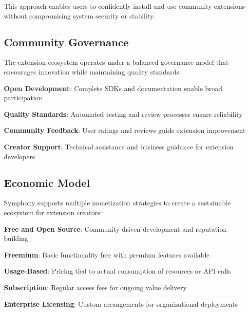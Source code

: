 This approach enables users to confidently install and use community extensions without compromising system security or stability.

\subsection*{Community Governance}

The extension ecosystem operates under a \textcolor{brandAccent}{balanced governance model} that encourages innovation while maintaining quality standards:

\begin{infobox}[title=Governance Principles]
\begin{compactlist}
    \item \textbf{Open Development}: Complete SDKs and documentation enable broad participation
    \item \textbf{Quality Standards}: Automated testing and review processes ensure reliability
    \item \textbf{Community Feedback}: User ratings and reviews guide extension improvement
    \item \textbf{Creator Support}: Technical assistance and business guidance for extension developers
\end{compactlist}
\end{infobox}

\subsection*{Economic Model}

Symphony supports multiple monetization strategies to create a sustainable ecosystem for extension creators:

\begin{compactlist}
    \item \textbf{Free and Open Source}: Community-driven development and reputation building
    \item \textbf{Freemium}: Basic functionality free with premium features available
    \item \textbf{Usage-Based}: Pricing tied to actual consumption of resources or API calls
    \item \textbf{Subscription}: Regular access fees for ongoing value delivery
    \item \textbf{Enterprise Licensing}: Custom arrangements for organizational deployments
\end{compactlist}

